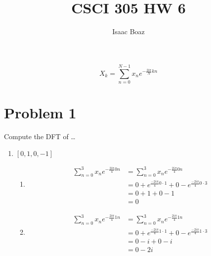 \documentclass{article}
\title{\vspace{-1.2in} CSCI 305 HW 6}
\author{Isaac Boaz}
\begin{document}
\maketitle

\begin{equation*}
      X_k = \sum_{n=0}^{N-1} x_n e^{-\frac{2i \pi}{N}kn}
\end{equation*}

\section*{Problem 1}

Compute the DFT of \dots

\begin{enumerate}[label=\Alph*)]
      \item \([0, 1, 0, -1]\)
            \begin{enumerate}[label={k=\arabic*}, start=0]
                  \item \begin{align*}
                              \sum_{n=0}^{3}{x_n e^{-\frac{2 i \pi}{4}0n}} & = \sum_{n=0}^{3}{x_n e^{-\frac{2 i \pi}{4}0n}}                                \\
                                                                           & = 0 + e^{\frac{-2 i \pi}{4} 0 \cdot 1} + 0 - e^{\frac{-2 i \pi}{4} 0 \cdot 3} \\
                                                                           & = 0 + 1 + 0 - 1                                                               \\
                                                                           & = 0
                        \end{align*}
                  \item \begin{align*}
                              \sum_{n=0}^{3}{x_n e^{-\frac{2 i \pi}{4}1n}} & = \sum_{n=0}^{3}{x_n e^{-\frac{2 i \pi}{4}1n}}                                \\
                                                                           & = 0 + e^{\frac{-2 i \pi}{4} 1 \cdot 1} + 0 - e^{\frac{-2 i \pi}{4} 1 \cdot 3} \\
                                                                           & = 0 - i + 0 - i                                                               \\
                                                                           & = 0 -2i

\end{align*}
\end{enumerate}
\end{enumerate}
\end{document}
